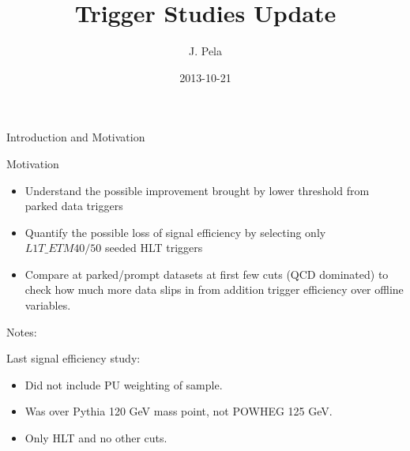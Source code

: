 \documentclass[8pt]{beamer}
\author[João Pela]{J. Pela}
\title[]{Trigger Studies Update}
\institute{Imperial College London}
\date{2013-10-21}
\begin{document}
\setlength{\unitlength}{1mm}

\begin{frame}
  \titlepage
\end{frame}

\begin{frame}{Introduction and Motivation}

\begin{block}{Motivation}

  \begin{itemize}
    \item Understand the possible improvement brought by lower threshold from parked data triggers
    \item Quantify the possible loss of signal efficiency by selecting only $L1T\_ETM{40/50}$ seeded HLT triggers
    \item Compare at parked/prompt datasets at first few cuts (QCD dominated) to check how much more data slips in from addition trigger efficiency
          over offline variables.
  \end{itemize}
  
\end{block}

\begin{block}{Notes:}

  Last signal efficiency study:
  \begin{itemize}
    \item Did not include PU weighting of sample.
    \item Was over Pythia 120 GeV mass point, not POWHEG 125 GeV.
    \item Only HLT and no other cuts.
  \end{itemize}
  
\end{block}

\end{frame}
\end{document}
